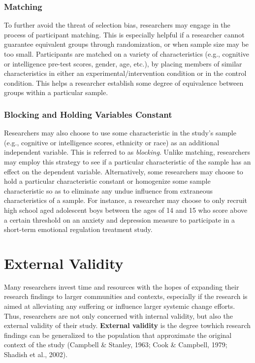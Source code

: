 \documentclass[
  11pt,
]{book}
\begin{document}
\subsubsection{Matching}\label{matching}

To further avoid the threat of selection bias, researchers may engage in the process of participant matching. This is especially helpful if a researcher cannot guarantee equivalent groups through randomization, or when sample size may be too small. Participants are matched on a variety of characteristics (e.g., cognitive or intelligence pre-test scores, gender, age, etc.), by placing members of similar characteristics in either an experimental/intervention condition or in the control condition. This helps a researcher establish some degree of equivalence between groups within a particular sample.

\subsubsection{Blocking and Holding Variables Constant}\label{blocking-and-holding-variables-constant}

Researchers may also choose to use some characteristic in the study's sample (e.g., cognitive or intelligence scores, ethnicity or race) as an additional independent variable. This is referred to as \emph{blocking}. Unlike matching, researchers may employ this strategy to see if a particular characteristic of the sample has an effect on the dependent variable. Alternatively, some researchers may choose to hold a particular characteristic constant or homogenize some sample characteristic so as to eliminate any undue influence from extraneous characteristics of a sample. For instance, a researcher may choose to only recruit high school aged adolescent boys between the ages of 14 and 15 who score above a certain threshold on an anxiety and depression measure to participate in a short-term emotional regulation treatment study.

\section{External Validity}\label{external-validity}

Many researchers invest time and resources with the hopes of expanding their research findings to larger communities and contexts, especially if the research is aimed at alleviating any suffering or influence larger systemic change efforts. Thus, researchers are not only concerned with internal validity, but also the external validity of their study. \textbf{External validity} is the degree towhich research findings can be generalized to the population that approximate the original context of the study (Campbell \& Stanley, 1963; Cook \& Campbell, 1979; Shadish et al., 2002).
\end{document}
